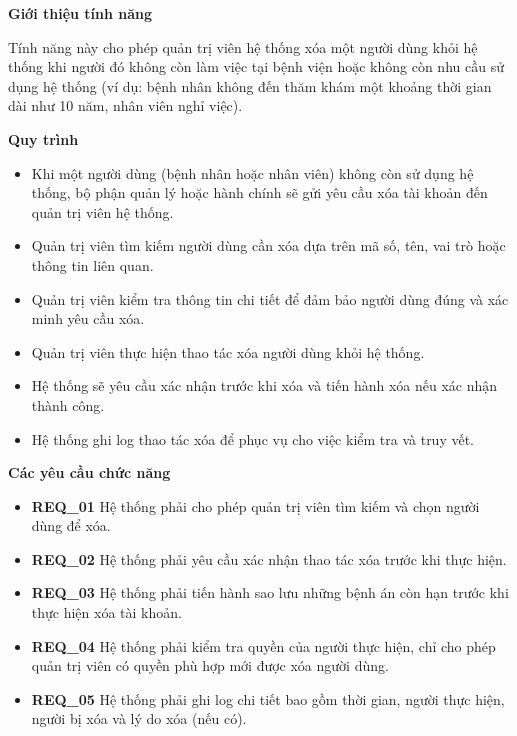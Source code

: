 \noindent \textbf{Giới thiệu tính năng}

Tính năng này cho phép quản trị viên hệ thống xóa một người dùng khỏi hệ thống khi người đó không còn làm việc tại bệnh viện hoặc không còn nhu cầu sử dụng hệ thống (ví dụ: bệnh nhân không đến thăm khám một khoảng thời gian dài như 10 năm, nhân viên nghỉ việc).

\noindent \textbf{Quy trình}

\begin{itemize}

  \item Khi một người dùng (bệnh nhân hoặc nhân viên) không còn sử dụng hệ thống, bộ phận quản lý hoặc hành chính sẽ gửi yêu cầu xóa tài khoản đến quản trị viên hệ thống.

  \item Quản trị viên tìm kiếm người dùng cần xóa dựa trên mã số, tên, vai trò hoặc thông tin liên quan.

  \item Quản trị viên kiểm tra thông tin chi tiết để đảm bảo người dùng đúng và xác minh yêu cầu xóa.

  \item Quản trị viên thực hiện thao tác xóa người dùng khỏi hệ thống.

  \item Hệ thống sẽ yêu cầu xác nhận trước khi xóa và tiến hành xóa nếu xác nhận thành công.

  \item Hệ thống ghi log thao tác xóa để phục vụ cho việc kiểm tra và truy vết.

\end{itemize}

\noindent \textbf{Các yêu cầu chức năng}

\begin{itemize}

  \item \textbf{REQ\_01} Hệ thống phải cho phép quản trị viên tìm kiếm và chọn người dùng để xóa.

  \item \textbf{REQ\_02} Hệ thống phải yêu cầu xác nhận thao tác xóa trước khi thực hiện.

  \item \textbf{REQ\_03} Hệ thống phải tiến hành sao lưu những bệnh án còn hạn trước khi thực hiện xóa tài khoản.

  \item \textbf{REQ\_04} Hệ thống phải kiểm tra quyền của người thực hiện, chỉ cho phép quản trị viên có quyền phù hợp mới được xóa người dùng.

  \item \textbf{REQ\_05} Hệ thống phải ghi log chi tiết bao gồm thời gian, người thực hiện, người bị xóa và lý do xóa (nếu có).
\end{itemize}
